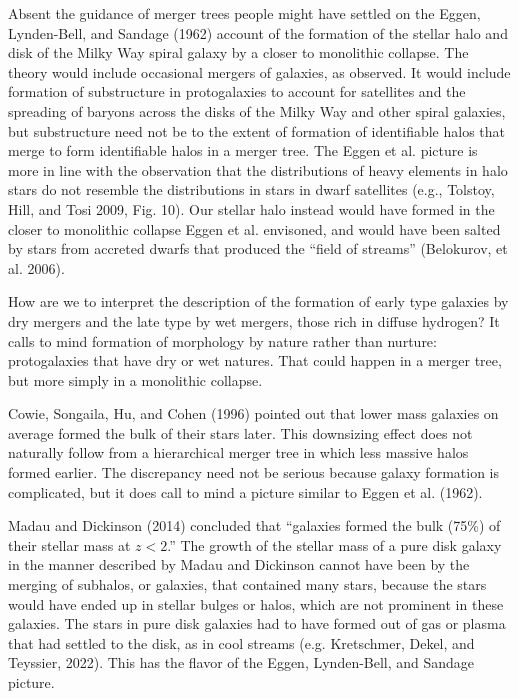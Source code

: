 \documentclass[fleqn,usenatbib]{mnras}
\begin{document}
Absent the guidance of merger trees people might have settled on the Eggen, Lynden-Bell, and Sandage (1962) account of the formation of the stellar halo and disk of the Milky Way spiral galaxy by a closer to monolithic collapse. The theory would include occasional mergers of galaxies, as observed. It would include formation of substructure in protogalaxies to account for satellites and the spreading of baryons across the disks of the Milky Way and other spiral galaxies, but substructure need not be to the extent of formation of identifiable halos that merge to form identifiable halos in a merger tree. The Eggen et al. picture is more in line with the observation that the distributions of heavy elements in halo stars do not resemble the distributions in stars in dwarf satellites (e.g., Tolstoy, Hill, and Tosi 2009, Fig. 10). Our stellar halo instead would have formed in the closer to monolithic collapse Eggen et al. envisoned, and would have been salted by stars from accreted dwarfs that produced the ``field of streams'' (Belokurov, et al. 2006).

How are we to interpret the description of the formation of early type galaxies by dry mergers and the late type by wet mergers, those rich in diffuse hydrogen? It calls to mind formation of morphology by nature rather than nurture: protogalaxies that have dry or wet natures. That could happen in a merger tree, but more simply in a monolithic collapse.

Cowie, Songaila, Hu, and Cohen (1996) pointed out that lower mass galaxies on average formed the bulk of their stars later. This downsizing effect does not naturally follow from a hierarchical merger tree in which less massive halos formed earlier. The discrepancy need not be serious because galaxy formation is complicated, but it does call to mind a picture similar to Eggen et al. (1962).

Madau and Dickinson (2014) concluded that ``galaxies formed the bulk (75\%) of their stellar mass at $z < 2$.'' The growth of the stellar mass of a pure disk galaxy in the manner described by Madau and Dickinson cannot have been by the merging of subhalos, or galaxies, that contained many stars, because the stars would have ended up in stellar bulges or halos, which are not prominent in these galaxies. The stars in pure disk galaxies had to have formed out of gas or plasma that had settled to the disk, as in cool streams (e.g. Kretschmer, Dekel, and Teyssier, 2022). This has the flavor of the Eggen, Lynden-Bell, and Sandage picture. 
\end{document}
